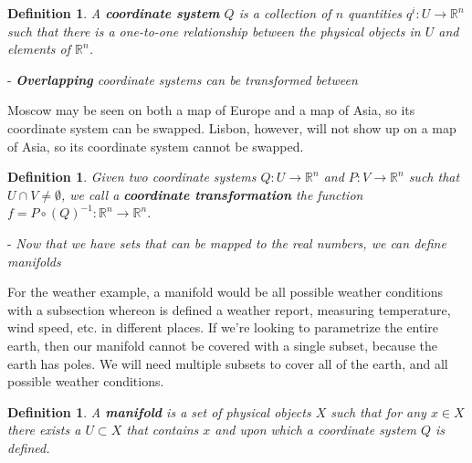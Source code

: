\documentclass{book}
\newtheorem{defn}[equation]{Definition}
\begin{document}
\begin{defn}
	A \textbf{coordinate system} $Q$ is a collection of $n$ quantities $q^i : U \to \mathbb{R}^n$ such that there is a one-to-one relationship between the physical objects in $U$ and elements of $\mathbb{R}^n$.
\end{defn}


- \emph{\textbf{Overlapping} coordinate systems can be transformed between}

Moscow may be seen on both a map of Europe and a map of Asia, so its coordinate system can be swapped. Lisbon, however, will not show up on a map of Asia, so its coordinate system cannot be swapped. 


\begin{defn}
	Given two coordinate systems  $Q : U \to \mathbb{R}^n$ and $P : V \to \mathbb{R}^n$ such that $U \cap V \neq \emptyset$, we call a \textbf{coordinate transformation} the function $f = P \circ (Q)^{-1} : \mathbb{R}^n \to \mathbb{R}^n$.
\end{defn}




- \emph{Now that we have sets that can be mapped to the real numbers, we can define manifolds}

For the weather example, a manifold would be all possible weather conditions with a subsection whereon is defined a weather report, measuring temperature, wind speed, etc. in different places. If we're looking to parametrize the entire earth, then our manifold cannot be covered with a single subset, because the earth has poles. We will need multiple subsets to cover all of the earth, and all possible weather conditions. 


 
\begin{defn}
	A \textbf{manifold} is a set of physical objects $X$ such that for any $x \in X$ there exists a $U \subset X$ that contains $x$ and upon which a coordinate system $Q$ is defined.
\end{defn}
\end{document}
